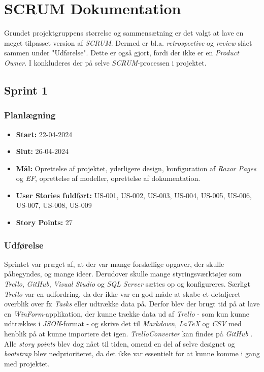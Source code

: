 \chapter{SCRUM Dokumentation}
\label{chapter:scrum-documentation}
Grundet projektgruppens størrelse og sammensætning er det valgt at lave en meget tilpasset version af \emph{SCRUM}. Dermed er bl.a. \emph{retrospective} og \emph{review} slået sammen under "Udførelse". 
Dette er også gjort, fordi der ikke er en \emph{Product Owner}. I  konkluderes der på selve \emph{SCRUM}-processen i projektet.

\section{Sprint 1}
\label{sec:sprint-1}
\subsection{Planlægning}
\label{subsec:sprint-1-plan}
\begin{itemize}
    \item \textbf{Start:} 22-04-2024
    \item \textbf{Slut:} 26-04-2024
    \item \textbf{Mål:} Oprettelse af projektet, yderligere design, konfiguration af \emph{Razor Pages} og \emph{EF}, oprettelse af modeller, oprettelse af dokumentation.
    \item \textbf{User Stories fuldført:} US-001, US-002, US-003, US-004, US-005, US-006, US-007, US-008, US-009
    \item \textbf{Story Points:} 27
\end{itemize}

\subsection{Udførelse}
\label{subsec:sprint-1-udforelse}
Sprintet var præget af, at der var mange forskellige opgaver, der skulle påbegyndes, og mange ideer. 
Derudover skulle mange styringsværktøjer som \emph{Trello}, \emph{GitHub}, \emph{Visual Studio} og \emph{SQL Server} sættes op og konfigureres. 
Særligt \emph{Trello} var en udfordring, da der ikke var en god måde at skabe et detaljeret overblik over fx \emph{Tasks} eller udtrække data på. 
Derfor blev der brugt tid på at lave en \emph{WinForm}-applikation, der kunne trække data ud af \emph{Trello} - som kun kunne udtrækkes i \emph{JSON}-format - og skrive det til \emph{Markdown}, \emph{LaTeX} og \emph{CSV} med henblik på at kunne importere det igen. 
\emph{TrelloConverter} kan findes på \emph{GitHub} \cite{trello-converter}. 
Alle \emph{story points} blev dog nået til tiden, omend en del af selve designet og \emph{bootstrap} blev nedprioriteret, da det ikke var essentielt for at kunne komme i gang med projektet.

